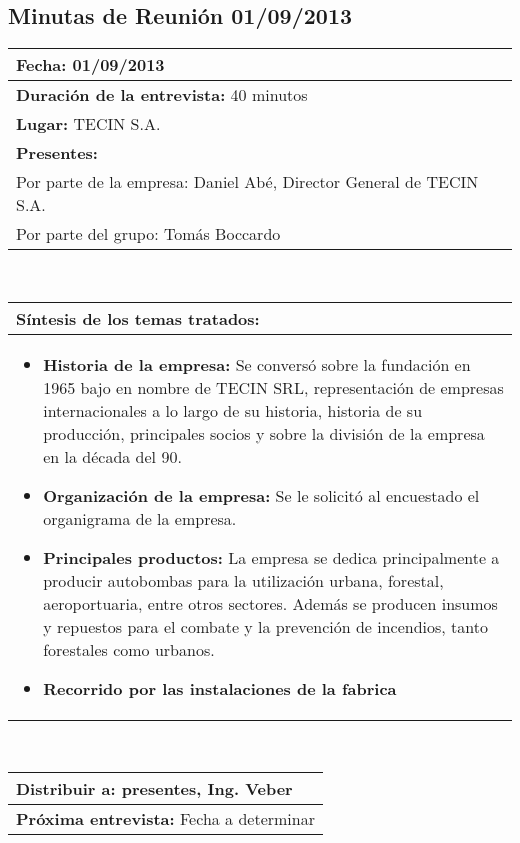 \subsection{Minutas de Reunión 01/09/2013}
\begin{flushleft}
	\begin{tabular}{|p{15cm}|}
		\hline
		\textbf{Fecha:} 01/09/2013 \\ \hline
		\textbf{Duración de la entrevista:} 40 minutos\\ \hline
		\textbf{Lugar:} TECIN S.A.\\ \hline
		\textbf{Presentes:} \\
			Por parte de la empresa: Daniel Abé, Director General de TECIN S.A. \\ 
			Por parte del grupo: Tomás Boccardo \\ \hline
	\end{tabular}  \\
	\vspace{0.7cm}
	\begin{tabular}{|p{15cm}|}
		\hline
		\textbf{Síntesis de los temas tratados:}\\
		\hline
		\begin{itemize}
			\item \textbf{Historia de la empresa:}
			Se conversó sobre la fundación en 1965 bajo en nombre de TECIN SRL, representación de empresas internacionales a lo 				largo de su historia, historia de su producción, principales socios y sobre la división de la empresa en la década 					del 90.

		\item \textbf{Organización de la empresa:} 
		Se le solicitó al encuestado el organigrama de la empresa.

		\item \textbf{Principales productos:} La empresa se dedica principalmente a producir autobombas para 
		la utilización urbana, forestal, aeroportuaria, entre otros sectores. Además se producen insumos y repuestos para el 				combate y la prevención de incendios, tanto forestales como urbanos.
		
		\item \textbf{Recorrido por las instalaciones de la fabrica}

		\end{itemize} \\ \hline
	\end{tabular} \\
	\vspace{0.7cm}
	\begin{tabular}{|p{15cm}|}                
		\hline 
		\textbf{Distribuir a:} presentes, Ing. Veber\\
		\hline
		\textbf{Próxima entrevista:} Fecha a determinar\\
		\hline
	\end{tabular}	
	
\end{flushleft}